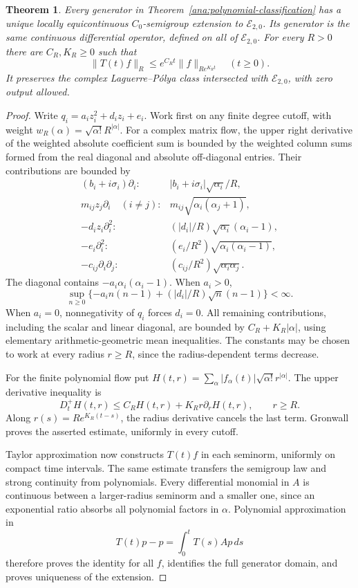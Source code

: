 \documentclass[reqno]{amsart}
\newtheorem{theorem}{Theorem}[section]
\theoremstyle{definition}
\theoremstyle{remark}
\begin{document}
\begin{theorem}\label{ana:minimal-quadratic}
Every generator in Theorem~\ref{ana:polynomial-classification} has a unique
locally equicontinuous \(C_0\)-semigroup extension to \(\mathcal E_{2,0}\).
Its generator is the same continuous differential operator, defined on
all of \(\mathcal E_{2,0}\).  For every \(R>0\) there are \(C_R,K_R\ge0\)
such that
\[
 \|T(t)f\|_R\le e^{C_Rt}\|f\|_{R e^{K_Rt}}
 \quad(t\ge0).
\]
It preserves the complex Laguerre--P\'olya class intersected with
\(\mathcal E_{2,0}\), with zero output allowed.
\end{theorem}
\begin{proof}
Write \(q_i=a_i z_i^2+d_i z_i+e_i\).  Work first on any finite degree
cutoff, with weight \(w_R(\alpha)=\sqrt{\alpha!}R^{|\alpha|}\).
For a complex matrix flow, the upper right derivative of the weighted
absolute coefficient sum is bounded by the weighted column sums formed
from the real diagonal and absolute off-diagonal entries.  Their
contributions are bounded by
\[
\begin{array}{ll}
 (b_i+i\sigma_i)\partial_i:
       &|b_i+i\sigma_i|\sqrt{\alpha_i}/R,\\
 m_{ij}z_j\partial_i\quad(i\ne j):
       &m_{ij}\sqrt{\alpha_i(\alpha_j+1)},\\
 -d_i z_i\partial_i^2:
       &(|d_i|/R)\sqrt{\alpha_i}(\alpha_i-1),\\
 -e_i\partial_i^2:
       &(e_i/R^2)\sqrt{\alpha_i(\alpha_i-1)},\\
 -c_{ij}\partial_i\partial_j:
       &(c_{ij}/R^2)\sqrt{\alpha_i\alpha_j}.
\end{array}
\]
The diagonal contains \(-a_i\alpha_i(\alpha_i-1)\).  When \(a_i>0\),
\[
 \sup_{n\ge0}\{-a_i n(n-1)+(|d_i|/R)\sqrt n(n-1)\}<\infty.
\]
When \(a_i=0\), nonnegativity of \(q_i\) forces \(d_i=0\).
All remaining contributions, including the scalar and linear diagonal,
are bounded by \(C_R+K_R|\alpha|\), using elementary arithmetic-geometric
mean inequalities.  The constants may be chosen to work at every radius
\(r\ge R\), since the radius-dependent terms decrease.

For the finite polynomial flow put
\(H(t,r)=\sum_\alpha |f_\alpha(t)|\sqrt{\alpha!}r^{|\alpha|}\).
The upper derivative inequality is
\[
 D_t^+H(t,r)\le C_RH(t,r)+K_Rr\partial_r H(t,r),\qquad r\ge R.
\]
Along \(r(s)=R e^{K_R(t-s)}\), the radius derivative cancels the last term.
Gronwall proves the asserted estimate, uniformly in every cutoff.

Taylor approximation now constructs \(T(t)f\) in each seminorm,
uniformly on compact time intervals.  The same estimate transfers the
semigroup law and strong continuity from polynomials.  Every
differential monomial in \(A\) is continuous between a larger-radius
seminorm and a smaller one, since an exponential ratio absorbs all
polynomial factors in \(\alpha\).  Polynomial approximation in
\[
 T(t)p-p=\int_0^tT(s)Ap\,ds
\]
therefore proves the identity for all \(f\), identifies the full generator
domain, and proves uniqueness of the extension.


\end{proof}
\end{document}
